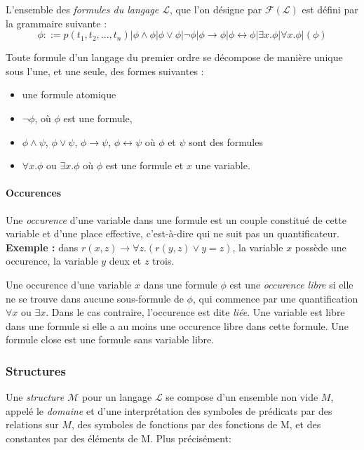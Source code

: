 \documentclass[a4paper]{article}
\begin{document}
  L'ensemble des \textit{formules du langage $\mathcal{L}$}, que l'on désigne par
  $\mathcal{F}(\mathcal{L})$ est défini par la grammaire suivante :
  $$ \phi ::= p(t_1, t_2,...,t_n) | \phi \land \phi | \phi \lor \phi | \lnot \phi | \phi \rightarrow \phi | \phi \leftrightarrow \phi | \exists x.\phi | \forall x.\phi | (\phi) $$

  Toute formule d'un langage du premier ordre se décompose de manière unique sous
  l'une, et une seule, des formes suivantes :
  \begin{itemize}
    \item une formule atomique
    \item $\lnot \phi$, où $\phi$ est une formule,
    \item $\phi \land \psi$, $\phi \lor \psi$, $\phi \rightarrow \psi$, $\phi \leftrightarrow \psi$
    où $\phi$ et $\psi$ sont des formules
    \item $\forall x. \phi$ ou $ \exists x.\phi$ où $\phi$ est une formule et $x$ une variable.
   \end{itemize}

   \paragraph{Occurences}
   Une \textit{occurence} d'une variable dans une formule est un couple constitué
   de cette variable et d'une place effective, c'est-à-dire qui ne suit pas 
   un quantificateur. \textbf{Exemple :} dans $r(x,z) \rightarrow \forall z.(r(y,z) \lor y = z)$,
   la variable $x$ possède une occurence, la variable $y$ deux et $z$ trois.

   Une occurence d'une variable $x$ dans une formule $\phi$ est une \textit{occurence libre}
   si elle ne se trouve dans aucune sous-formule de $\phi$, qui commence par une
   quantification $\forall x$ ou $\exists x$. Dans le cas contraire, l'occurence
   est dite \textit{liée}. Une variable est libre dans une formule si elle a 
   au moins une occurence libre dans cette formule. Une formule close est une formule
   sans variable libre.

   \subsubsection{Structures}
   Une \textit{structure $\mathcal{M}$} pour un langage $\mathcal{L}$ se compose
   d'un ensemble non vide $M$, appelé le \textit{domaine} et d'une interprétation des
   symboles de prédicats par des relations sur $M$, des symboles de fonctions
   par des fonctions de M, et des constantes par des éléments de M. Plus précisément:
\end{document}
